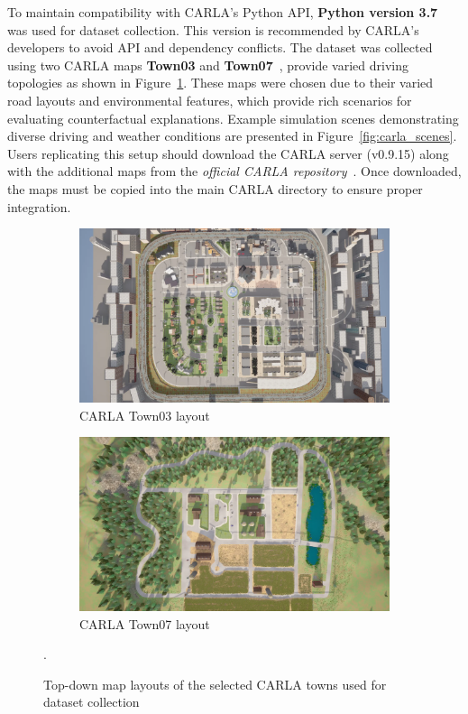 To maintain compatibility with CARLA’s Python API, \textbf{Python version 3.7} was used for dataset collection. This version is recommended by CARLA’s developers to avoid API and dependency conflicts. The dataset was collected using two CARLA maps \textbf{Town03} and \textbf{Town07}~\cite{CARLA2024}, provide varied driving topologies as shown in Figure~\ref{fig:carla_maps}. These maps were chosen due to their varied road layouts and environmental features, which provide rich scenarios for evaluating counterfactual explanations. Example simulation scenes demonstrating diverse driving and weather conditions are presented in Figure~\ref{fig:carla_scenes}. Users replicating this setup should download the CARLA server (v0.9.15) along with the additional maps from the \textit{official CARLA repository}~\cite{CARLA2024docs}. Once downloaded, the maps must be copied into the main CARLA directory to ensure proper integration.

\begin{figure}[htbp]
    \centering
    \begin{subfigure}{0.48\textwidth}
        \centering
        \includegraphics[width=\linewidth]{img/carla/town03.png}
        \caption{CARLA Town03 layout}
    \end{subfigure}
    \hfill
    \begin{subfigure}{0.48\textwidth}
        \centering
        \includegraphics[width=\linewidth]{img/carla/town_7.png}
        \caption{CARLA Town07 layout}
    \end{subfigure}
    \caption{Top-down map layouts of the selected CARLA towns used for dataset collection~\cite{CARLA2024}}.
    \label{fig:carla_maps}
\end{figure}

